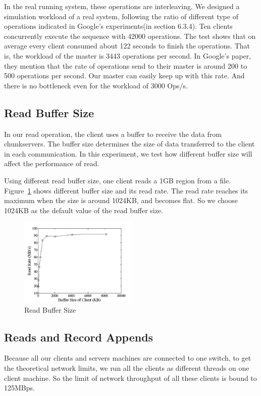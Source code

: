 \documentclass[letterpaper,twocolumn,10pt]{article}
\begin{document}
In the real running system, these operations are interleaving. We designed a simulation workload of a real system, following the ratio of different type of operations indicated in Google's experiments(in \cite{gfs2003} section 6.3.4). Ten clients concurrently execute the sequence with 42000 operations. The test shows that on average every client consumed about 122 seconds to finish the operations. That is, the workload of the master is 3443 operations per second. In Google's paper, they mention that the rate of operations send to their master is around 200 to 500 operations per second. Our master can easily keep up with this rate. And there is no bottleneck even for the workload of 3000 Ops/s. 
\subsection{Read Buffer Size}
In our read operation, the client uses a buffer to receive the data from chunkservers. The buffer size determines the size of data transferred to the client in each communication. In this experiment, we test how different buffer size will affect the performance of read. 

Using different read buffer size, one client reads a 1GB region from a file. Figure~\ref{fig:buffersize} shows different buffer size and its read rate. The read rate reaches its maximum when the size is around 1024KB, and becomes flat. So we choose 1024KB as the default value of the read buffer size. 
\begin{figure}
\centering
\includegraphics[width=0.5\textwidth]{buffersize}
\caption{Read Buffer Size}
\label{fig:buffersize}
\end{figure}

\subsection{Reads and Record Appends}
Because all our clients and servers machines are connected to one switch, to get the theoretical network limits, we run all the clients as different threads on one client machine. So the limit of network throughput of all these clients is bound to 125MBps. 
\end{document}
